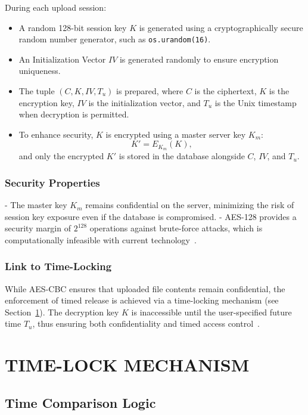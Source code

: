 \documentclass[12pt]{article}
\begin{document}
During each upload session:
\begin{itemize}
    \item A random 128-bit session key $K$ is generated using a cryptographically secure random number generator, such as \texttt{os.urandom(16)}.
    \item An Initialization Vector $IV$ is generated randomly to ensure encryption uniqueness.
    \item The tuple $(C, K, IV, T_u)$ is prepared, where $C$ is the ciphertext, $K$ is the encryption key, $IV$ is the initialization vector, and $T_u$ is the Unix timestamp when decryption is permitted.
    \item To enhance security, $K$ is encrypted using a master server key $K_m$:
    \[
    K' = E_{K_m}(K),
    \]
    and only the encrypted $K'$ is stored in the database alongside $C$, $IV$, and $T_u$.
\end{itemize}

\subsubsection{Security Properties}

- The master key $K_m$ remains confidential on the server, minimizing the risk of session key exposure even if the database is compromised.
- AES-128 provides a security margin of $2^{128}$ operations against brute-force attacks, which is computationally infeasible with current technology~\cite{stallings2017}.

\subsubsection{Link to Time-Locking}

While AES-CBC ensures that uploaded file contents remain confidential, the enforcement of timed release is achieved via a time-locking mechanism (see Section~\ref{sec:timelock}). The decryption key $K$ is inaccessible until the user-specified future time $T_u$, thus ensuring both confidentiality and timed access control~\cite{timelockpaper}.

\section{TIME-LOCK MECHANISM}\label{sec:timelock}

\subsection{Time Comparison Logic}
\end{document}
